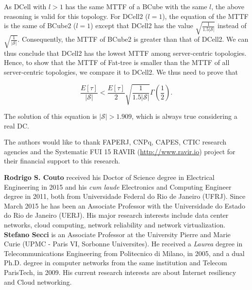 As DCell with $l>1$ has the same MTTF of a BCube with the same $l$, the above reasoning is valid for this topology. For DCell2 ($l=1$), the equation of the MTTF is the same of BCube2 ($l=1$) except that DCell2 has the value $\sqrt{\frac{1}{1.5|\mathcal{S}|}}$ instead of $\sqrt{\frac{1}{|\mathcal{S}|}}$. Consequently, the MTTF of BCube2 is greater than that of DCell2. We can thus conclude that DCell2 has the lowest MTTF among server-centric topologies. Hence, to show that the MTTF of Fat-tree is smaller than the MTTF of all server-centric topologies, we compare it to DCell2. We thus need to prove that

\begin{equation}
\frac{E[\tau]}{|\mathcal{S}|} < \frac{E[\tau]}{2}\sqrt{\frac{1}{1.5|\mathcal{S}|}} \Gamma \left (  \frac{1}{2} \right ).
\label{eq:statementLMTTF_fatTree_link}
\end{equation}

The solution of this equation is $|\mathcal{S}| > 1.909$, which is always true considering a real DC.

\begin{acknowledgements}
The authors would like to thank FAPERJ, CNPq, CAPES, CTIC research agencies and the Systematic FUI 15 RAVIR (\url{http://www.ravir.io}) project for their financial support to this research.
\end{acknowledgements}






\noindent
\textbf{Rodrigo S. Couto} received his Doctor of Science degree in Electrical Engineering in 2015 and his \textit{cum laude} Electronics and Computing Engineer degree in 2011, both from Universidade Federal do Rio de Janeiro (UFRJ). Since March 2015 he has been an Associate Professor with the Universidade do Estado do Rio de Janeiro (UERJ). His major research interests include data center networks, cloud computing, network reliability and network virtualization.\\ 

\noindent
\textbf{Stefano Secci} is an Associate Professor at the University Pierre and Marie Curie (UPMC - Paris VI, Sorbonne Universites). He received a  \textit{Laurea} degree in Telecommunications Engineering from Politecnico di Milano, in 2005, and a dual Ph.D. degree in computer networks from the same institution and Telecom ParisTech, in 2009. His current research interests are about Internet resiliency and Cloud networking.\\


